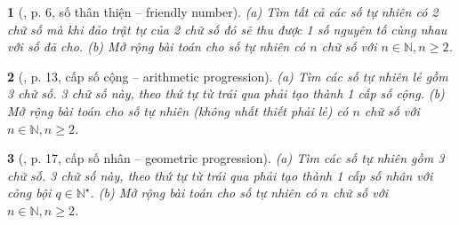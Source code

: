 \documentclass{article}
\newtheorem{baitoan}{}
\begin{document}
\begin{baitoan}[\cite{Huy_sang_tao_thuat_toan_lap_trinh_tap_1}, p. 6, số thân thiện -- friendly number]
	(a) Tìm tất cả các số tự nhiên có 2 chữ số mà khi đảo trật tự của 2 chữ số đó sẽ thu được 1 số nguyên tố cùng nhau với số đã cho. (b) Mở rộng bài toán cho số tự nhiên có $n$ chữ số với $n\in\mathbb{N},n\ge2$.
\end{baitoan}

\begin{baitoan}[\cite{Huy_sang_tao_thuat_toan_lap_trinh_tap_1}, p. 13, cấp số cộng -- arithmetic progression]
	(a) Tìm các số tự nhiên lẻ gồm 3 chữ số. 3 chữ số này, theo thứ tự từ trái qua phải tạo thành 1 cấp số cộng. (b) Mở rộng bài toán cho số tự nhiên (không nhất thiết phải lẻ) có $n$ chữ số với $n\in\mathbb{N},n\ge2$.
\end{baitoan}

\begin{baitoan}[\cite{Huy_sang_tao_thuat_toan_lap_trinh_tap_1}, p. 17, cấp số nhân -- geometric progression]
	(a) Tìm các số tự nhiên gồm 3 chữ số. 3 chữ số này, theo thứ tự từ trái qua phải tạo thành 1 cấp số nhân với công bội $q\in\mathbb{N}^\star$. (b) Mở rộng bài toán cho số tự nhiên có $n$ chữ số với $n\in\mathbb{N},n\ge2$.
\end{baitoan}
\end{document}
